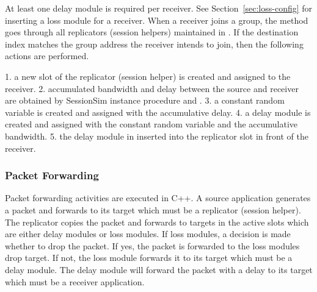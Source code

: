 \documentclass{article}
\begin{document}
At least one delay module is required per receiver.
See Section~\ref{sec:loss-config} for inserting a loss module for a receiver.
When a receiver joins a group, 
the  method goes through
all replicators (session helpers) maintained in .
If the destination index matches the group address
the receiver intends to join, then the following actions are performed.

1. a new slot of the replicator (session helper) is created and assigned to the receiver.
2. accumulated bandwidth and delay between the source and receiver are obtained by SessionSim instance procedure  and .
3. a constant random variable is created and assigned with the
accumulative delay.
4. a delay module is created and assigned with the constant random 
variable and the accumulative bandwidth.
5. the delay module in inserted into the replicator slot in
front of the receiver.



\subsubsection{Packet Forwarding}
Packet forwarding activities are executed in C++.  A source application 
generates a packet and forwards to its target which must be a replicator 
(session helper).  The replicator copies the packet and forwards 
to targets in the active slots which are either delay modules or loss modules. If loss modules, a decision is made whether to drop the packet.
If yes, the packet is forwarded to the loss modules drop target.  If not,
the loss module forwards it to its target which must be a delay module.
The delay module will forward the packet with a delay to its target which
must be a receiver application.
\end{document}
